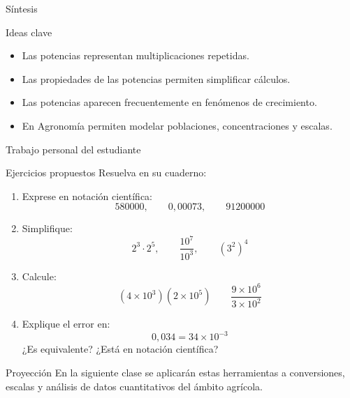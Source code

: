 \documentclass[aspectratio=169,10pt,handout]{beamer}
\begin{document}
\begin{frame}{Síntesis}
	
	\begin{block}{Ideas clave}
		
		\begin{itemize}
			
			\item Las potencias representan multiplicaciones repetidas.
			
			\item Las propiedades de las potencias permiten simplificar cálculos.
			
			\item Las potencias aparecen frecuentemente en fenómenos de crecimiento.
			
			\item En Agronomía permiten modelar poblaciones, concentraciones y escalas.
			
		\end{itemize}
		
	\end{block}
	
\end{frame}	
	\begin{frame}{Trabajo personal del estudiante}
		\begin{block}{Ejercicios propuestos}
			Resuelva en su cuaderno:
			\begin{enumerate}
				\item Exprese en notación científica:
				\[
				580000,\qquad 0{,}00073,\qquad 91200000
				\]
				\item Simplifique:
				\[
				2^3\cdot2^5,\qquad \frac{10^7}{10^3},\qquad (3^2)^4
				\]
				\item Calcule:
				\[
				(4\times10^3)(2\times10^5)
				\qquad
				\frac{9\times10^6}{3\times10^2}
				\]
				\item Explique el error en:
				\[
				0{,}034 = 34\times10^{-3}
				\]
				¿Es equivalente? ¿Está en notación científica?
			\end{enumerate}
		\end{block}
		
		\begin{exampleblock}{Proyección}
			En la siguiente clase se aplicarán estas herramientas a conversiones, escalas y análisis de datos cuantitativos del ámbito agrícola.
		\end{exampleblock}
	\end{frame}
	
\end{document}

